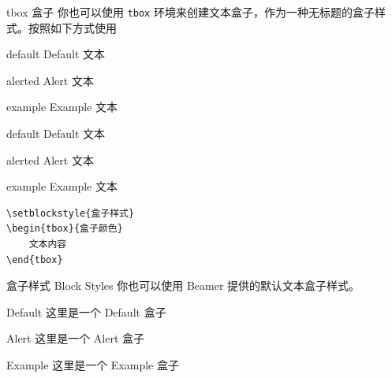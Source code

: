 \documentclass[10pt,aspectratio=169,fontset=none]{ctexbeamer}
\begin{document}
    \begin{frame}[fragile]{tbox 盒子}
        你也可以使用 \texttt{tbox} 环境来创建文本盒子，作为一种无标题的盒子样式。按照如下方式使用
        
        \begin{minipage}[b]{0.23\textwidth}
        \begin{tbox}{default}
            Default 文本
        \end{tbox}
        \begin{tbox}{alerted}
            Alert 文本
        \end{tbox}
        \begin{tbox}{example}
            Example 文本
        \end{tbox}      
        \end{minipage}
        \hspace{1cm}
        \begin{minipage}[b]{0.23\textwidth}
        \begin{tbox}{default}
            Default 文本
        \end{tbox}
        \begin{tbox}{alerted}
            Alert 文本
        \end{tbox}
        \begin{tbox}{example}
            Example 文本
        \end{tbox}      
        \end{minipage}
        \hspace{0.7cm}
        \begin{minipage}[b]{0.35\textwidth}
            \begin{verbatim}
\setblockstyle{盒子样式}
\begin{tbox}{盒子颜色}
    文本内容
\end{tbox}
            \end{verbatim}
        \end{minipage}
    \end{frame}

    \begin{frame}{盒子样式 Block Styles}
        你也可以使用 Beamer 提供的默认文本盒子样式。
        \begin{center}
            \begin{minipage}[b]{0.5\textwidth}
                \begin{block}{ Default }
                    这里是一个 Default 盒子
                \end{block}
                \begin{alertblock}{Alert}
                    这里是一个 Alert 盒子
                \end{alertblock}
                \begin{exampleblock}{Example}
                    这里是一个 Example 盒子
                \end{exampleblock}
            \end{minipage}
        \end{center}
    \end{frame}
\end{document}
